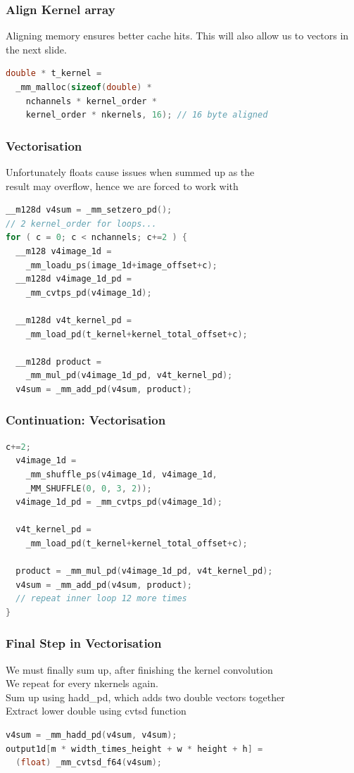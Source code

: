 \documentclass{beamer}
\begin{document}
\begin{frame}[fragile]
\frametitle{Align Kernel array}
Aligning memory ensures better cache hits. This will also
allow us to vectors in the next slide.
\begin{lstlisting}[language=C,keywordstyle=\color{blue}]
double * t_kernel = 
  _mm_malloc(sizeof(double) * 
    nchannels * kernel_order * 
    kernel_order * nkernels, 16); // 16 byte aligned
\end{lstlisting}
\end{frame}

\begin{frame}[fragile]
\frametitle{Vectorisation}
Unfortunately floats cause issues when summed up as the \\
result may overflow, hence we are forced to work with \\
\begin{lstlisting}[language=C,keywordstyle=\color{blue}]
__m128d v4sum = _mm_setzero_pd();
// 2 kernel_order for loops...
for ( c = 0; c < nchannels; c+=2 ) {
  __m128 v4image_1d = 
    _mm_loadu_ps(image_1d+image_offset+c);
  __m128d v4image_1d_pd = 
    _mm_cvtps_pd(v4image_1d);

  __m128d v4t_kernel_pd = 
    _mm_load_pd(t_kernel+kernel_total_offset+c);

  __m128d product = 
    _mm_mul_pd(v4image_1d_pd, v4t_kernel_pd);
  v4sum = _mm_add_pd(v4sum, product);

\end{lstlisting}
\end{frame}

\begin{frame}[fragile]
\frametitle{Continuation: Vectorisation}
\begin{lstlisting}[language=C,keywordstyle=\color{blue}]
  c+=2;
  v4image_1d = 
    _mm_shuffle_ps(v4image_1d, v4image_1d, 
    _MM_SHUFFLE(0, 0, 3, 2));
  v4image_1d_pd = _mm_cvtps_pd(v4image_1d);

  v4t_kernel_pd = 
    _mm_load_pd(t_kernel+kernel_total_offset+c);

  product = _mm_mul_pd(v4image_1d_pd, v4t_kernel_pd);
  v4sum = _mm_add_pd(v4sum, product);
  // repeat inner loop 12 more times 
}
\end{lstlisting}
\end{frame}

\begin{frame}[fragile]
\frametitle{Final Step in Vectorisation}
We must finally sum up, after finishing the kernel convolution \\
We repeat for every nkernels again. \\
Sum up using hadd\_pd, which adds two double vectors together \\
Extract lower double using cvtsd function
\begin{lstlisting}[language=C,keywordstyle=\color{blue}]
v4sum = _mm_hadd_pd(v4sum, v4sum); 
output1d[m * width_times_height + w * height + h] = 
  (float) _mm_cvtsd_f64(v4sum); 
\end{lstlisting}
\end{frame}
\end{document}
